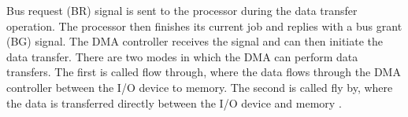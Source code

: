 Bus request (BR) signal is sent to the processor during the data transfer operation.
The processor then finishes its current job and replies with a bus grant (BG) signal.
The DMA controller receives the signal and can then initiate the data transfer.
There are two modes in which the DMA can perform data transfers.
The first is called flow through, where the data flows through the DMA controller between the I/O device to memory.
The second is called fly by, where the data is transferred directly between the I/O device and memory \cite{ahmed_design_2019}.


